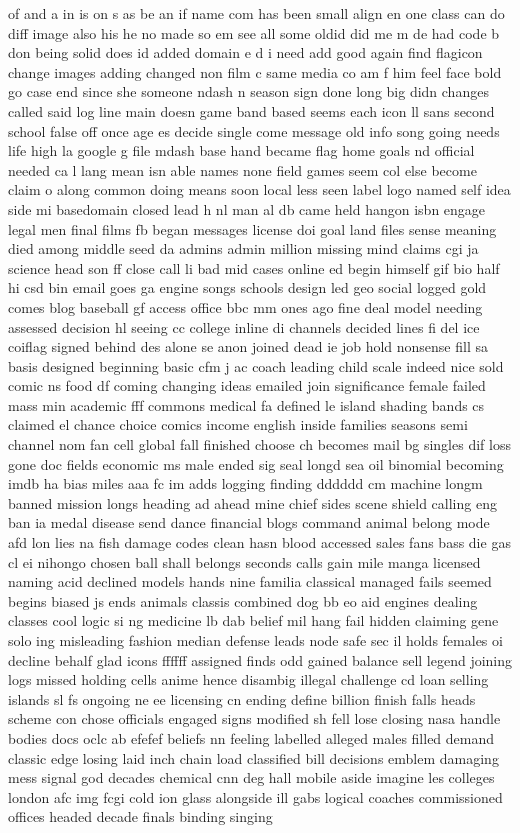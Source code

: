 \documentclass[10pt,a4paper]{article}
\begin{document}
\noindent of and a in is on s as be an if name com has been small align en one class can do diff image also his he no made so em see all some oldid did me m de had code b don being solid does id added domain e d i need add good again find flagicon change images adding changed non film c same media co am f him feel face bold go case end since she someone ndash n season sign done long big didn changes called said log line main doesn game band based seems each icon ll sans second school false off once age es decide single come message old info song going needs life high la google g file mdash base hand became flag home goals nd official needed ca l lang mean isn able names none field games seem col else become claim o along common doing means soon local less seen label logo named self idea side mi basedomain closed lead h nl man al db came held hangon isbn engage legal men final films fb began messages license doi goal land files sense meaning died among middle seed da admins admin million missing mind claims cgi ja science head son ff close call li bad mid cases online ed begin himself gif bio half hi csd bin email goes ga engine songs schools design led geo social logged gold comes blog baseball gf access office bbc mm ones ago fine deal model needing assessed decision hl seeing cc college inline di channels decided lines fi del ice coiflag signed behind des alone se anon joined dead ie job hold nonsense fill sa basis designed beginning basic cfm j ac coach leading child scale indeed nice sold comic ns food df coming changing ideas emailed join significance female failed mass min academic fff commons medical fa defined le island shading bands cs claimed el chance choice comics income english inside families seasons semi channel nom fan cell global fall finished choose ch becomes mail bg singles dif loss gone doc fields economic ms male ended sig seal longd sea oil binomial becoming imdb ha bias miles aaa fc im adds logging finding dddddd cm machine longm banned mission longs heading ad ahead mine chief sides scene shield calling eng ban ia medal disease send dance financial blogs command animal belong mode afd lon lies na fish damage codes clean hasn blood accessed sales fans bass die gas cl ei nihongo chosen ball shall belongs seconds calls gain mile manga licensed naming acid declined models hands nine familia classical managed fails seemed begins biased js ends animals classis combined dog bb eo aid engines dealing classes cool logic si ng medicine lb dab belief mil hang fail hidden claiming gene solo ing misleading fashion median defense leads node safe sec il holds females oi decline behalf glad icons ffffff assigned finds odd gained balance sell legend joining logs missed holding cells anime hence disambig illegal challenge cd loan selling islands sl fs ongoing ne ee licensing cn ending define billion finish falls heads scheme con chose officials engaged signs modified sh fell lose closing nasa handle bodies docs oclc ab efefef beliefs nn feeling labelled alleged males filled demand classic edge losing laid inch chain load classified bill decisions emblem damaging mess signal god decades chemical cnn deg hall mobile aside imagine les colleges london afc img fcgi cold ion glass alongside ill gabs logical coaches commissioned offices headed decade finals binding singing 
\end{document}
